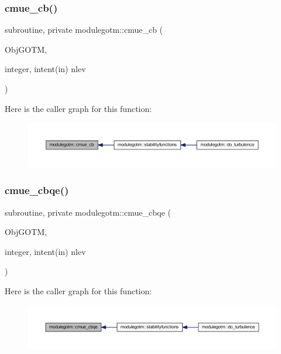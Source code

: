 \subsubsection{\texorpdfstring{cmue\+\_\+cb()}{cmue\_cb()}}
{\footnotesize\ttfamily subroutine, private modulegotm\+::cmue\+\_\+cb (\begin{DoxyParamCaption}\item[{}]{Obj\+G\+O\+TM,  }\item[{integer, intent(in)}]{nlev }\end{DoxyParamCaption})\hspace{0.3cm}{\ttfamily [private]}}

Here is the caller graph for this function\+:\nopagebreak
\begin{figure}[H]
\begin{center}
\leavevmode
\includegraphics[width=350pt]{namespacemodulegotm_a2b38e80c2393abb45f25640cd3fda481_icgraph}
\end{center}
\end{figure}
\mbox{\label{namespacemodulegotm_ab183ae0777bf5a1d3c5b4ebbb9c2b9b5}} 
\subsubsection{\texorpdfstring{cmue\+\_\+cbqe()}{cmue\_cbqe()}}
{\footnotesize\ttfamily subroutine, private modulegotm\+::cmue\+\_\+cbqe (\begin{DoxyParamCaption}\item[{}]{Obj\+G\+O\+TM,  }\item[{integer, intent(in)}]{nlev }\end{DoxyParamCaption})\hspace{0.3cm}{\ttfamily [private]}}

Here is the caller graph for this function\+:\nopagebreak
\begin{figure}[H]
\begin{center}
\leavevmode
\includegraphics[width=350pt]{namespacemodulegotm_ab183ae0777bf5a1d3c5b4ebbb9c2b9b5_icgraph}
\end{center}
\end{figure}
\mbox{\label{namespacemodulegotm_a39841630271ec0cdc9e21a9bc1bfc289}} 

